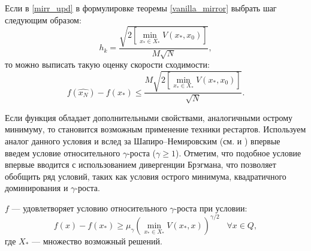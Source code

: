     \begin{remark}
        Если в \eqref{mirr_upd} в формулировке теоремы \ref{vanilla_mirror} выбрать шаг следующим образом:
        \begin{equation} \label{mirr_step}
            h_{k} = \frac{\sqrt{2 \left[\min\limits_{x_* \in X_*}{V(x_*, x_0)}\right] }}{M\sqrt{N}},
        \end{equation}
        то можно выписать такую оценку скорости сходимости:
        \begin{equation} \label{mirr_est}
            f(\widehat{x_N}) - f(x_*) \leq \frac{M\sqrt{2 \left[\min\limits_{x_* \in X_*}{V(x_*, x_0)}\right]}}{\sqrt{N}}.
        \end{equation}
    \end{remark}
    Если функция обладает дополнительными свойствами, аналогичными острому минимуму,  то становится возможным применение техники рестартов. Используем аналог данного условия и вслед за Шапиро–Немировским (см. \cite{shapiro_2005} и \cite{shapiro_2021} ) впервые введем условие относительного $\gamma$-роста ($\gamma \geq 1$). Отметим, что подобное условие впервые вводится с использованием дивергенции Брэгмана, что позволяет обобщить ряд условий, таких как условия острого минимума, квадратичного доминирования и $\gamma$-роста.
    \begin{definition}
       $f$ --- удовлетворяет условию относительного $\gamma$-роста при условии:
       \begin{equation} \label{gamma-growth}
           f(x) - f(x_*) \geq \mu_{\gamma}\left(\min_{x_* \in X_*}{V(x_*,x)}\right)^{\gamma/2} \;\;\; \forall x \in Q,
       \end{equation}
       где $X_*$ --- множество возможный решений.  
    \end{definition}
    
